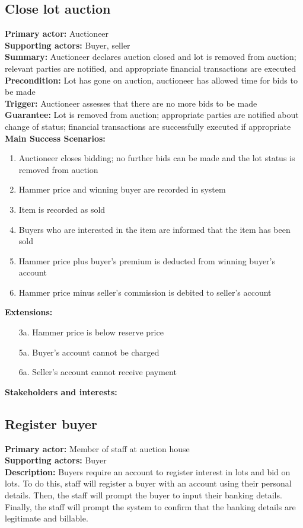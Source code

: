 \documentclass[titlepage, 12pt]{extarticle}
\begin{document}
\subsection{Close lot auction}
{\bf Primary actor: } Auctioneer 
\\{\bf Supporting actors: } Buyer, seller
\\{\bf Summary: } Auctioneer declares auction closed and lot is removed from auction; relevant parties are notified, and appropriate financial transactions are executed
\\{\bf Precondition: } Lot has gone on auction, auctioneer has allowed time for bids to be made
\\{\bf Trigger: } Auctioneer assesses that there are no more bids to be made
\\{\bf Guarantee: } Lot is removed from auction; appropriate parties are notified about change of status; financial transactions are successfully executed if appropriate
\\{\bf Main Success Scenarios: }
\begin{enumerate}
\item Auctioneer closes bidding; no further bids can be made and the lot status is removed from auction
\item Hammer price and winning buyer are recorded in system
\item Item is recorded as sold
\item Buyers who are interested in the item are informed that the item has been sold
\item Hammer price plus buyer's premium is deducted from winning buyer's account
\item Hammer price minus seller's commission is debited to seller's account
\end{enumerate}
{\bf Extensions: }
\begin{itemize}
\item [3a.] Hammer price is below reserve price
\item [5a.] Buyer's account cannot be charged 
\item [6a.] Seller's account cannot receive payment
\end{itemize}
{\bf Stakeholders and interests: }
\subsection{Register buyer}
{\bf Primary actor: } Member of staff at auction house
\\{\bf Supporting actors: } Buyer
\\{\bf Description: } Buyers require an account to register interest in lots and bid on lots. To do this, staff will register a buyer with an account using their personal details. Then, the staff will prompt the buyer to input their banking details. Finally, the staff will prompt the system to confirm that the banking details are legitimate and billable.
\end{document}
